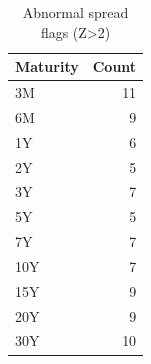 \begin{table}
\caption{Abnormal spread flags (Z>2)}
\label{tab:6_2}
\begin{tabular}{lr}
\toprule
Maturity & Count \\
\midrule
3M & 11 \\
6M & 9 \\
1Y & 6 \\
2Y & 5 \\
3Y & 7 \\
5Y & 5 \\
7Y & 7 \\
10Y & 7 \\
15Y & 9 \\
20Y & 9 \\
30Y & 10 \\
\bottomrule
\end{tabular}
\end{table}
